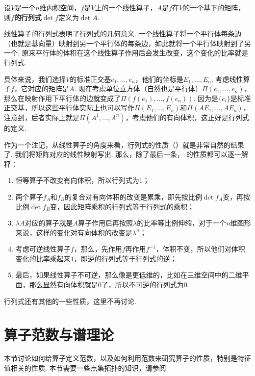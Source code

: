 \begin{definition}[线性算子的行列式]
设$V$是一个$n$维内积空间，$f$是$V$上的一个线性算子，$A$是$f$在$V$的一个基下的矩阵，则$f$\textbf{的行列式}$\det f$定义为$\det A$.
\end{definition}

线性算子的行列式表明了行列式的几何意义. 一个线性算子将一个平行体每条边（也就是基向量）映射到另一个平行体的每条边，如此就将一个平行体映射到了另一个. 原来平行体的体积在这个线性算子作用后会发生改变，这个变化的比率就是行列式. 

具体来说，我们选择$V$的标准正交基$e_1,\dots,e_n$，他们的坐标是$E_1,\dots,E_n$. 考虑线性算子$f$，它对应的矩阵是$A$. 现在考虑单位立方体（自然也是平行体）$\Pi(e_1,\dots,e_n)$，那么在映射作用下平行体的边就变成了$\Pi(f(e_1),\dots,f(e_n))$. 因为是$\{e_i\}$是标准正交基，所以这些平行体实际上也可以写作$\Pi(E_1,\dots,E_n)$和$\Pi(AE_1,\dots,AE_n)$，注意到，后者实际上就是$\Pi(A^1,\dots, A^n)$，考虑他们的有向体积，这正好是行列式的定义. 

作为一个注记，从线性算子的角度来看，行列式的性质（）就是非常自然的结果了. 我们将矩阵对应的线性映射写出. 那么，除了最后一条， 的性质都可以逐一解释：
\begin{enumerate}
    \item 恒等算子不改变有向体积，所以行列式为$1$；
    \item 两个算子$f_A$和$f_B$的复合对有向体积的改变是累乘，即先按比例$\det f_A$变，再按比例$\det f_B$变，因此矩阵乘积的行列式等于行列式的乘积；
    \item $\lambda A$对应的算子就是$A$算子作用后再按照$\lambda$的比率等比例伸缩，对于一个$n$维图形来说，这样的变化对有向体积的改变是$\lambda^n$；
    \item 考虑可逆线性算子$f$，那么，先作用$f$再作用$f^{-1}$，体积不变，所以他们对体积变化的比率乘起来$1$，即逆的行列式等于行列式的逆；
    \item 最后，如果线性算子不可逆，那么像是更低维的，比如在三维空间中的二维平面，那么显然有向体积就是$0$了，所以不可逆的行列式为$0$.
\end{enumerate}

行列式还有其他的一些性质，这里不再讨论. 

\section{算子范数与谱理论}\label{sec:operator-norm}

本节讨论如何给算子定义范数，以及如何利用范数来研究算子的性质，特别是特征值相关的性质. 本节需要一些点集拓扑的知识，请参阅.

